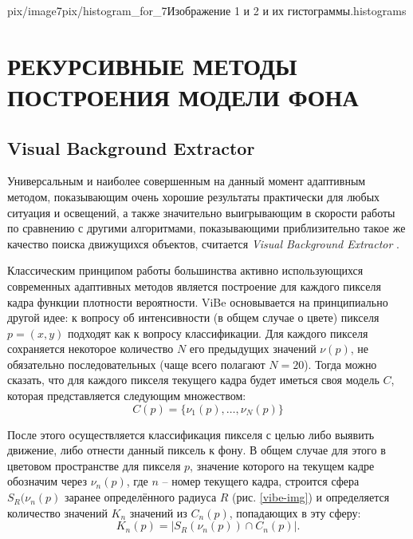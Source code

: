 {pix/image7}{pix/histogram_for_7}{Изображение 1 и 2
и их гистограммы.}{histograms}

\newpage


\newpage

\section{\centering\nohyphens{РЕКУРСИВНЫЕ МЕТОДЫ ПОСТРОЕНИЯ МОДЕЛИ ФОНА}}

\subsection{Visual Background Extractor}

Универсальным и наиболее совершенным на данный момент адаптивным методом,
показывающим очень хорошие результаты практически для любых ситуация и
освещений, а также значительно выигрывающим в скорости работы по сравнению с
другими алгоритмами, показывающими приблизительно такое же качество поиска
движущихся объектов, считается {\it Visual Background Extractor} 
\cite{van-vibe}.

Классическим принципом работы большинства активно использующихся современных 
адаптивных методов является построение для каждого пикселя кадра функции
плотности вероятности. ViBe основывается на принципиально другой идее:
к вопросу об интенсивности (в общем случае о цвете) пикселя $p=(x,y)$ 
подходят как к вопросу классификации. Для каждого пикселя сохраняется 
некоторое количество $N$ его предыдущих значений $\nu(p)$, не обязательно
последовательных (чаще всего полагают $N=20$). Тогда можно сказать, что для
каждого пикселя текущего кадра будет иметься своя модель $C$, которая
представляется следующим множеством:
\begin{equation}
 C(p)=\{ \nu_1(p), \ldots, \nu_N(p) \}
 \label{vibe-equat1}
\end{equation}

После этого осуществляется классификация пикселя с целью либо выявить движение,
либо отнести данный пиксель к фону. В общем случае для этого в цветовом 
пространстве для пикселя $p$, значение которого на текущем кадре обозначим
через $\nu_n(p)$, где $n$ -- номер текущего кадра, строится сфера
$S_R(\nu_n(p)$ заранее определённого радиуса $R$ (рис. \ref{vibe-img}) и
определяется количество значений $K_n$ значений из $C_n(p)$, попадающих
в эту сферу:
\begin{equation}
	K_n(p)= |S_R(\nu_n(p)) \cap C_n(p)|.
	\label{vibe-equat-2}
\end{equation}

